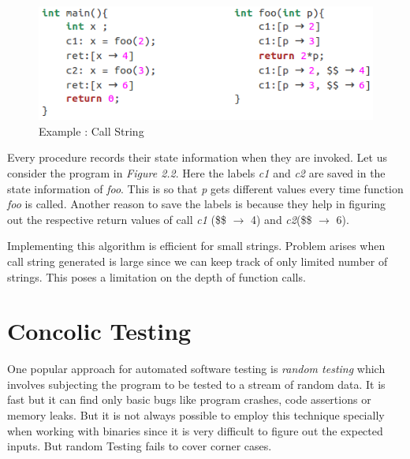 \documentclass[12pt,oneside]{book}
\begin{document}
\begin{figure}[htbp]
\centering
\includegraphics[scale=0.6]{callString.png}
\caption{Example : Call String}
\end{figure}  
 
Every procedure records their state information when they are invoked. Let us consider the program in \textit{Figure 2.2}. Here the labels \textit{c1} and \textit{c2} are saved in the state information of \textit{foo}. This is so that \textit{p} gets different values every time function \textit{foo} is called. Another reason to save the labels is because they help in figuring out the respective return values of call \textit{c1} (\$\$ $\rightarrow$ 4) and \textit{c2}(\$\$ $\rightarrow$ 6).

Implementing this algorithm is efficient for small strings. Problem arises when call string generated is large since we can keep track of only limited number of strings. This poses a limitation on the depth of function calls.



\section {Concolic Testing}

One popular approach for automated software testing is \textit{random testing} which involves subjecting the program to be tested to a stream of random data. It is fast but it can find only basic bugs like program crashes, code assertions or memory leaks. But it is not always possible to employ this technique specially when working with binaries since it is very difficult to figure out the expected inputs. But random Testing fails to cover corner cases.\\
\end{document}
